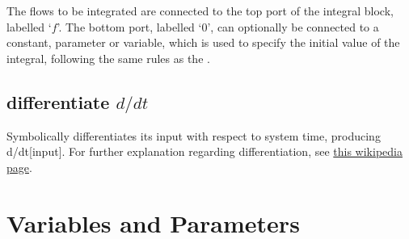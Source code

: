 The flows to be integrated are connected to the top port of the integral
block, labelled `$f$'. The bottom port, labelled `0', can optionally
be connected to a constant, parameter or variable, which is used to
specify the initial value of the integral, following the same rules as
the .

\subsection{differentiate $d/dt$}


\label{Operation:differentiate} Symbolically differentiates its input
with respect to system time, producing d/dt{[}input{]}. For further
explanation regarding differentiation, see \href{https://en.wikipedia.org/wiki/Derivative}{this wikipedia page}.


\section{Variables and Parameters}

\label{Variables}\label{Variable:constant}\label{VarConstant}\label{Variable:parameter}
\label{Variable:flow}\label{Variable:integral}\label{Variable:stock}


